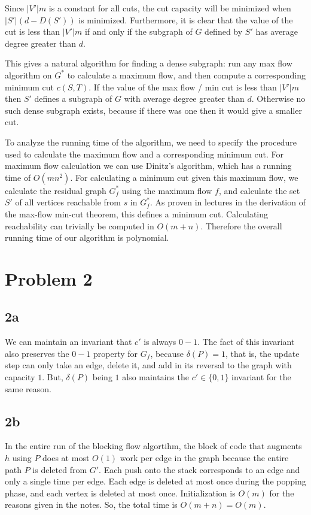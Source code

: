 \documentclass{article}
\begin{document}
Since $|V'|m$ is a constant for all cuts, the cut capacity will be minimized when
$|S'|(d - D(S'))$ is minimized. Furthermore, it is clear that the value of the cut
is less than $|V'|m$ if and only if the subgraph of $G$ defined by $S'$ has
average degree greater than $d$.

This gives a natural algorithm for finding a dense subgraph: run any max flow algorithm
on $G^*$ to calculate a maximum flow, and then compute a corresponding minimum
cut $c(S, T)$. If the value of the max flow / min cut is less than $|V'|m$ then $S'$ defines
a subgraph of $G$ with average degree greater than $d$. Otherwise no such dense subgraph
exists, because if there was one then it would give a smaller cut.

To analyze the running time of the algorithm, we need to specify the procedure used to
calculate the maximum flow and a corresponding minimum cut. For maximum flow calculation
we can use Dinitz's algorithm, which has a running time of $O(mn^2)$. For calculating
a minimum cut given this maximum flow, we calculate the residual graph $G^*_f$ using the
maximum flow $f$, and calculate the set $S'$ of all vertices reachable from $s$ in $G^*_f$.
As proven in lectures in the derivation of the max-flow min-cut theorem, this defines
a minimum cut. Calculating reachability can trivially be computed in $O(m + n)$. Therefore
the overall running time of our algorithm is polynomial.

\section*{Problem 2}

\subsection*{2a}
We can maintain an invariant that $c'$ is always $0-1$. The fact of this
invariant also preserves the $0-1$ property for $G_f$, because $\delta(P) = 1$,
that is, the update step can only take an edge, delete it, and add in its
reversal to the graph with capacity $1$. But, $\delta(P)$ being $1$ also
maintains the $c' \in \{0,1\}$ invariant for the same reason.

\subsection*{2b}

In the entire run of the blocking flow algortihm, the block of code that
augments $h$ using $P$ does at most $O(1)$ work per edge in the graph because
the entire path $P$ is deleted from $G'$. Each push onto the stack corresponds
to an edge and only a single time per edge. Each edge is deleted at most once
during the popping phase, and each vertex is deleted at most once.
Initialization is $O(m)$ for the reasons given in the notes. So, the total time
is $O(m+n) = O(m)$.
\end{document}
